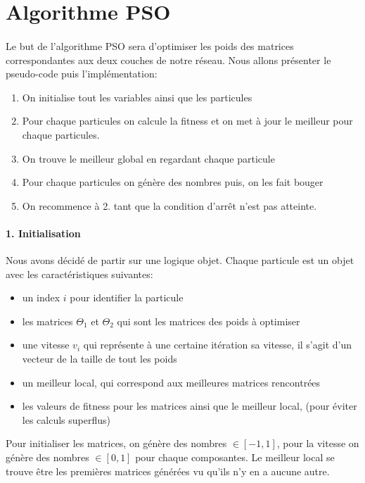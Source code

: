 \documentclass[a4paper, 11pt]{article}
\begin{document}
\section{Algorithme PSO}

\paragraph{}Le but de l'algorithme PSO sera d'optimiser les poids des matrices correspondantes aux deux couches de notre réseau.
Nous allons présenter le pseudo-code puis l'implémentation:
\begin{enumerate}
 \item On initialise tout les variables ainsi que les particules
 \item Pour chaque particules on calcule la fitness et on met à jour le meilleur pour chaque particules.
 \item On trouve le meilleur global en regardant chaque particule
 \item Pour chaque particules on génère des nombres puis, on les fait bouger
 \item On recommence à 2. tant que la condition d'arrêt n'est pas atteinte.
\end{enumerate}

\paragraph{1. Initialisation}
Nous avons décidé de partir sur une logique objet. Chaque particule est un objet avec les caractéristiques suivantes:
\begin{itemize}
  \item un index $i$ pour identifier la particule
 \item les matrices $\Theta_1$ et $\Theta_2$ qui sont les matrices des poids à optimiser
 \item une vitesse $v_i$ qui représente à une certaine itération sa vitesse, il s'agit d'un vecteur de la taille de tout les poids
 \item un meilleur local, qui correspond aux meilleures matrices rencontrées
 \item les valeurs de fitness pour les matrices ainsi que le meilleur local, (pour éviter les calculs superflus)
\end{itemize}

Pour initialiser les matrices, on génère des nombres $\in [-1,1]$, pour la vitesse on génère des nombres $\in [0,1]$ pour chaque
composantes. Le meilleur local se trouve être les premières matrices générées vu qu'ils n'y en a aucune autre.
\end{document}
